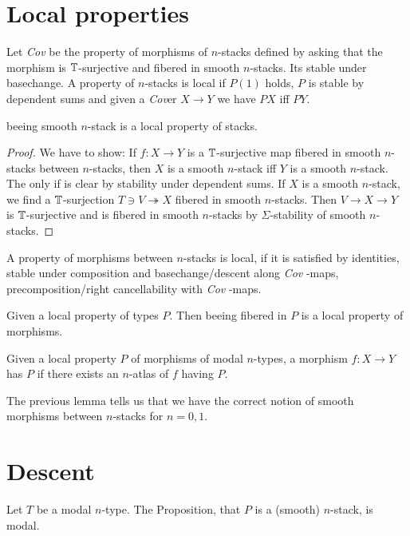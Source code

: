 \documentclass{article}
\newcommand{\Cov}{\emph{Cov} }
\newcommand{\Cover}{\emph{Cov}er }
\begin{document}
\section{Local properties}

\begin{definition}
Let \Cov be the property of morphisms of  $n$-stacks defined by asking that the morphism is $\mathbb{T}$-surjective and fibered in smooth $n$-stacks. Its stable under basechange. A property of  $n$-stacks is local if $P(1)$ holds, $P$ is stable by dependent sums and given a \Cover  $X \to Y$ we have $P X$ iff $P Y$.
\end{definition}
\begin{example}    
    beeing smooth $n$-stack is a local property of  stacks.
\end{example}
\begin{proof}
    We have to show: If $f : X \to Y$ is a $\mathbb{T}$-surjective map fibered in smooth $n$-stacks between  $n$-stacks, then $X$ is a smooth $n$-stack iff $Y$ is a smooth $n$-stack.
    The only if is clear by stability under dependent sums.
    If $X$ is a smooth $n$-stack, we find a $\mathbb{T}$-surjection $T \ni V \twoheadrightarrow X$ fibered in smooth $n$-stacks. Then $V \to X \to Y$ is $\mathbb{T}$-surjective and is fibered in smooth $n$-stacks by $\Sigma$-stability of smooth $n$-stacks.
\end{proof}

\begin{definition}
    A property of morphisms between  $n$-stacks is local, if it is satisfied by identities, stable under composition and basechange/descent along \Cov-maps, precomposition/right cancellability with \Cov-maps.
\end{definition}
\begin{lemma}
    Given a local property of types $P$. Then beeing fibered in $P$ is a local property of morphisms.
\end{lemma}
\begin{lemma}
    Given a local property $P$ of morphisms of modal $n$-types, a morphism $f : X \to Y$ has $P$ if there exists an $n$-atlas of $f$ having $P$.
\end{lemma}
The previous lemma tells us that we have the correct notion of smooth morphisms between  $n$-stacks for $n = 0,1$.
\section{Descent}
 \begin{theorem}{\label{thm:descent}}
     Let $T$ be a modal $n$-type. The Proposition, that $P$ is a  (smooth) $n$-stack, is modal.
 \end{theorem}
\end{document}
